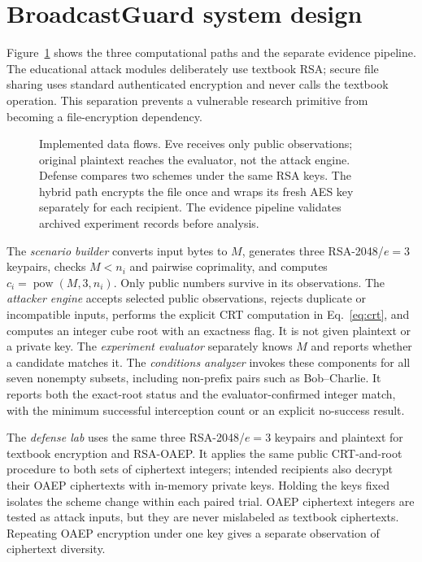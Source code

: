 \section{BroadcastGuard system design}
Figure~\ref{fig:architecture} shows the three computational paths and the separate evidence pipeline. The educational attack modules deliberately use textbook RSA; secure file sharing uses standard authenticated encryption and never calls the textbook operation. This separation prevents a vulnerable research primitive from becoming a file-encryption dependency.

\begin{figure}[!ht]
\centering
\resizebox{\linewidth}{!}{}
\caption{Implemented data flows. Eve receives only public observations; original plaintext reaches the evaluator, not the attack engine. Defense compares two schemes under the same RSA keys. The hybrid path encrypts the file once and wraps its fresh AES key separately for each recipient. The evidence pipeline validates archived experiment records before analysis.}
\label{fig:architecture}
\end{figure}

The \emph{scenario builder} converts input bytes to $M$, generates three RSA-2048/$e=3$ keypairs, checks $M<n_i$ and pairwise coprimality, and computes $c_i=\operatorname{pow}(M,3,n_i)$. Only public numbers survive in its observations. The \emph{attacker engine} accepts selected public observations, rejects duplicate or incompatible inputs, performs the explicit CRT computation in Eq.~\eqref{eq:crt}, and computes an integer cube root with an exactness flag. It is not given plaintext or a private key. The \emph{experiment evaluator} separately knows $M$ and reports whether a candidate matches it. The \emph{conditions analyzer} invokes these components for all seven nonempty subsets, including non-prefix pairs such as Bob--Charlie. It reports both the exact-root status and the evaluator-confirmed integer match, with the minimum successful interception count or an explicit no-success result.

The \emph{defense lab} uses the same three RSA-2048/$e=3$ keypairs and plaintext for textbook encryption and RSA-OAEP. It applies the same public CRT-and-root procedure to both sets of ciphertext integers; intended recipients also decrypt their OAEP ciphertexts with in-memory private keys. Holding the keys fixed isolates the scheme change within each paired trial. OAEP ciphertext integers are tested as attack inputs, but they are never mislabeled as textbook ciphertexts. Repeating OAEP encryption under one key gives a separate observation of ciphertext diversity.

